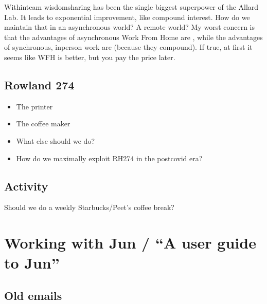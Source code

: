\documentclass[letterpaper,10pt,english]{sphinxmanual}
\begin{document}
\sphinxAtStartPar
Within\sphinxhyphen{}team wisdom\sphinxhyphen{}sharing has been the single biggest superpower of the Allard Lab. It leads to exponential improvement, like compound interest. How do we maintain that in an asynchronous world? A remote world? My worst concern is that the advantages of asynchronous Work From Home are , while the advantages of synchronous, in\sphinxhyphen{}person work are  (because they compound). If true, at first it seems like WFH is better, but you pay the price later.


\section{Rowland 274}
\label{\detokenize{05Group:rowland-274}}\begin{itemize}
\item {} 
\sphinxAtStartPar
The printer

\item {} 
\sphinxAtStartPar
The coffee maker

\item {} 
\sphinxAtStartPar
What else should we do?

\item {} 
\sphinxAtStartPar
How do we maximally exploit RH274 in the post\sphinxhyphen{}covid era?

\end{itemize}


\section{Activity}
\label{\detokenize{05Group:activity}}
\sphinxAtStartPar
Should we do a weekly Starbucks/Peet’s coffee break?

\sphinxstepscope


\chapter{Working with Jun / “A user guide to Jun”}
\label{\detokenize{06UserGuideToJun:working-with-jun-a-user-guide-to-jun}}\label{\detokenize{06UserGuideToJun::doc}}
\sphinxstepscope


\section{Old e\sphinxhyphen{}mails}
\label{\detokenize{OldEmails:old-e-mails}}\label{\detokenize{OldEmails::doc}}
\end{document}
